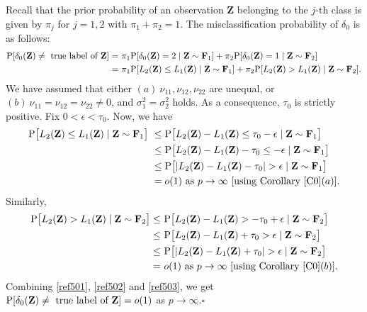 \documentclass[twoside]{article}
\newcommand{\bZ}{\mathbf{Z}}
\newcommand{\bF}{\mathbf{F}}
\newcommand{\0}{\mathbf{0}}
\newcommand{\1}{\mathbf{1}}
\newcommand*{\QEDB}{\hfill\ensuremath{\square}}
\numberwithin{equation}{section}
\begin{document}
Recall that the prior probability of an observation $\bZ$ belonging to the $j$-th class is given by $\pi_j$ for $j=1,2$ with $\pi_1+\pi_2=1$. The misclassification probability of $\delta_0$ is as follows:
\begin{align}\label{ref501}
{\rm P}[\delta_0(\bZ)\neq \text{ true label of }\bZ]
 =&\ \pi_1 {\rm P}[\delta_0(\bZ)=2\mid \bZ\sim\bF_1] + \pi_2{\rm P}[\delta_0(\bZ)=1\mid \bZ\sim\bF_2]\nonumber \\
 =&\ \pi_1 {\rm P}[L_2(\bZ)\leq L_1(\bZ)\mid \bZ\sim\bF_1]+ \pi_2{\rm P}[L_2(\bZ)> L_1(\bZ)\mid \bZ\sim\bF_2].
\end{align}
We have assumed that either $(a)\ \nu_{11},\nu_{12},\nu_{22}$ are unequal, or $(b)\ \nu_{11}=\nu_{12}=\nu_{22}\neq 0$, and $\sigma_1^2=\sigma_2^2$ holds. As a consequence, $\tau_0$ is strictly positive. Fix $0<\epsilon<\tau_0$. Now, we have
\begin{align}\label{ref502}
{\rm P}\big [L_2(\bZ)\leq L_1(\bZ)\mid \bZ\sim\bF_1\big ]
&\ \leq {\rm P}\big [L_2(\bZ)- L_1(\bZ)\leq \tau_0-\epsilon\mid \bZ\sim\bF_1\big ]\nonumber \\
&\ \leq {\rm P}\big [L_2(\bZ)- L_1(\bZ)- \tau_0 \leq -\epsilon\mid \bZ\sim\bF_1\big ]\nonumber \\
&\ \leq {\rm P}\big [|L_2(\bZ)- L_1(\bZ) - \tau_0|>\epsilon\mid \bZ\sim\bF_1\big ]\nonumber\\
&\ =o(1)\text{ as }p\to\infty\ [\text{using Corollary \ref{C0}}(a)].
\end{align}
Similarly,
\begin{align}\label{ref503}
{\rm P}\big [L_2(\bZ)> L_1(\bZ)\mid \bZ\sim\bF_2\big ]
\leq &\ {\rm P}\big [L_2(\bZ)- L_1(\bZ)> -\tau_0+\epsilon\mid \bZ\sim\bF_2\big ]\nonumber \\
\leq &\ {\rm P}\big [L_2(\bZ)- L_1(\bZ)+ \tau_0 > \epsilon\mid \bZ\sim\bF_2\big ]\nonumber \\
\leq &\ {\rm P}\big [|L_2(\bZ)- L_1(\bZ) + \tau_0|>\epsilon\mid \bZ\sim\bF_2\big ]\nonumber\\
=&\ o(1)\text{ as }p\to\infty\ [\text{using Corollary \ref{C0}}(b)].
\end{align}
Combining  \eqref{ref501}, \eqref{ref502} and \eqref{ref503}, we get ${\rm P}[\delta_0(\bZ)\neq \text{ true label of }\bZ]=o(1)$ as $p\to\infty$.\hfill\QEDB\newline
\end{document}
